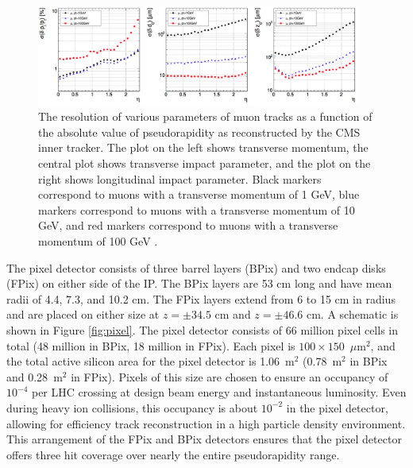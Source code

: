 \begin{figure}
  \centering
  \includegraphics[width=0.95\textwidth]{tex/cms/fig/tracker-resolution.png}
  \caption{The resolution of various parameters of muon tracks as a function of the absolute value of 
    pseudorapidity as reconstructed by the CMS inner tracker.  The plot on the left shows transverse momentum,
    the central plot shows transverse impact parameter, and the plot on the right shows
    longitudinal impact parameter.  Black markers correspond to muons with a transverse momentum of 1 GeV,
    blue markers correspond to muons with a transverse momentum of 10 GeV, and 
    red markers correspond to muons with a transverse momentum of 100 GeV \cite{cms-jinst}.}
  \label{fig:tracker-resolution}
\end{figure}

The pixel detector consists of three barrel layers (BPix)
and two endcap disks (FPix) on either side of the IP.  
The BPix layers are 53 cm long and have mean radii of 4.4, 7.3, and 10.2 cm.  
The FPix layers extend from 6 to 15 cm in radius and are 
placed on either size at $z = \pm 34.5$ cm and $z = \pm 46.6$ cm.
A schematic is shown in Figure \ref{fig:pixel}.
The pixel detector consists of 66 million pixel cells in total 
(48 million in BPix, 18 million in FPix).  Each pixel is 
$100 \times 150$~$\mu\text{m}^2$, and the total active silicon area for the pixel detector
is 1.06~$\text{m}^2$ (0.78~$\text{m}^2$ in BPix and 0.28~$\text{m}^2$
in FPix).  Pixels of this size are chosen to ensure an occupancy of $10^{-4}$ per LHC crossing
at design beam energy and instantaneous luminosity.
Even during heavy ion collisions, this occupancy is about $10^{-2}$ in the pixel detector, allowing for
efficiency track reconstruction in a high particle density environment.
This arrangement of the FPix and BPix detectors ensures that
the pixel detector offers three hit coverage over nearly the entire
pseudorapidity range. 


